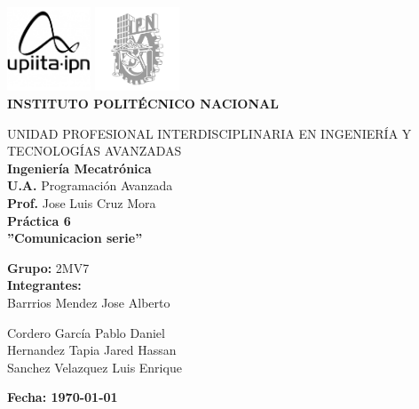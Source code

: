 \documentclass{article}
\begin{document}
\begin{center}
    \includegraphics[width=2.5cm]{upiita.png} \hfill \includegraphics[width=2.5cm]{POLI2.png} \\ 
    \vspace*{2\baselineskip}
    {\LARGE \textbf {INSTITUTO POLITÉCNICO NACIONAL}} \\
    \begin{Large}
    \vspace{2\baselineskip}
    UNIDAD PROFESIONAL INTERDISCIPLINARIA EN INGENIERÍA Y TECNOLOGÍAS AVANZADAS \\
    \vspace*{1\baselineskip}
    \textbf{Ingeniería Mecatrónica} \\
    \vspace*{2\baselineskip}
    \textbf{U.A.}  Programación Avanzada \\
    \textbf{Prof.} Jose Luis Cruz Mora \\
    \vspace*{3\baselineskip}
    {\huge \textbf{Práctica 6}} \\
    \vspace*{0.5\baselineskip}
    {\huge \textbf{''Comunicacion serie''}} \\

        \vspace*{3\baselineskip}
    \begin{flushleft}
    \textbf{Grupo:} 2MV7 \\
    \vspace*{2\baselineskip}
    \textbf{Integrantes:} \\ Barrrios Mendez Jose Alberto 
  
    \vspace{0.5\baselineskip}Cordero García Pablo Daniel\\
    \vspace{0.5\baselineskip}Hernandez Tapia Jared Hassan\\
    \vspace{0.5\baselineskip}Sanchez Velazquez Luis Enrique
    \end{flushleft}
    \vfill
    \begin{flushright}
        \textbf{Fecha: \today}
    \end{flushright}
\end{Large}
\end{center}
\end{document}
